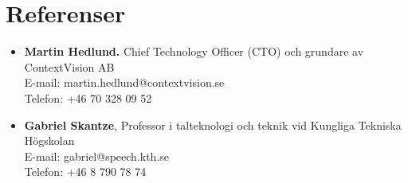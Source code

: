 \documentclass[10pt,a4paper,sans]{moderncv} %
\begin{document}
\section{Referenser}
\begin{itemize}
\item \textbf{Martin Hedlund.}
Chief Technology Officer (CTO) och grundare av ContextVision AB \\
E-mail: martin.hedlund@contextvision.se \\
Telefon: +46 70 328 09 52

\vspace{10pt}

\item \textbf{Gabriel Skantze}, Professor i talteknologi och teknik vid Kungliga Tekniska Högskolan \\
E-mail: gabriel@speech.kth.se \\
Telefon: +46 8 790 78 74
\end{itemize}








\end{document}
